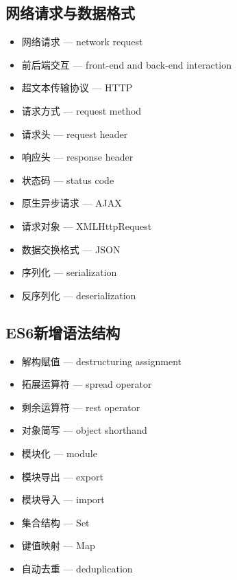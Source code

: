 \subsection{网络请求与数据格式}
\begin{itemize}
\item 网络请求 — network request
\item 前后端交互 — front-end and back-end interaction
\item 超文本传输协议 — HTTP
\item 请求方式 — request method
\item 请求头 — request header
\item 响应头 — response header
\item 状态码 — status code
\item 原生异步请求 — AJAX
\item 请求对象 — XMLHttpRequest
\item 数据交换格式 — JSON
\item 序列化 — serialization
\item 反序列化 — deserialization
\end{itemize}

\subsection{ES6新增语法结构}
\begin{itemize}
\item 解构赋值 — destructuring assignment
\item 拓展运算符 — spread operator
\item 剩余运算符 — rest operator
\item 对象简写 — object shorthand
\item 模块化 — module
\item 模块导出 — export
\item 模块导入 — import
\item 集合结构 — Set
\item 键值映射 — Map
\item 自动去重 — deduplication
\end{itemize}
